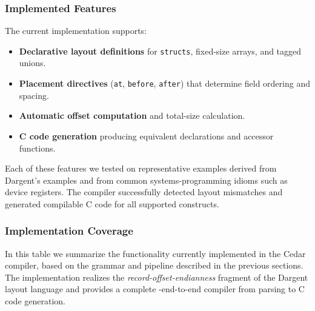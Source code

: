 \subsubsection{Implemented Features}
The current implementation supports:

\begin{itemize}
    \item \textbf{Declarative layout definitions} for \texttt{structs},
    fixed-size arrays, and tagged unions.
    \item \textbf{Placement directives} (\texttt{at}, \texttt{before}, \texttt{after})
    that determine field ordering and spacing.
    \item \textbf{Automatic offset computation} and total-size calculation.
    \item \textbf{C code generation} producing equivalent declarations
    and accessor functions.
\end{itemize}

Each of these features we tested on representative examples derived from
Dargent's examples and from common systems-programming idioms such as
device registers. The compiler successfully detected layout mismatches
and generated compilable C code for all supported constructs.

\subsubsection{Implementation Coverage}
In this table we summarize the functionality currently implemented in the
Cedar compiler, based on the grammar and pipeline described in
the previous sections. The implementation realizes the
\textit{record-offset-endianness} fragment of the Dargent layout language
and provides a complete -end-to-end compiler from parsing to C code
generation.

